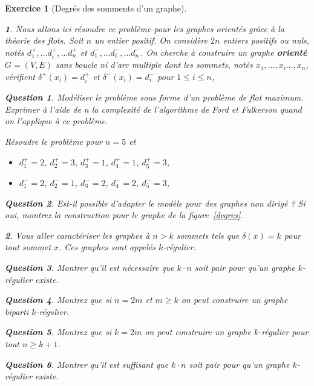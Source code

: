 \documentclass{article}
\theoremstyle{exostyle}
\newtheorem{exo}{Exercice}
\theoremstyle{partiestyle}
\newtheorem{partie}{}[exo]
\theoremstyle{questionstyle}
\newtheorem{questionpartie}{Question}[partie]
\begin{document}
\begin{exo}[Degrés des somments d'un graphe]
\begin{partie}
	Nous allons ici résoudre ce problème pour les graphes orientés grâce à la théorie des flots. Soit $n$ un entier positif. On considère $2n$ entiers positifs ou nuls, notés $d^+_1, \dots d^+_i, \dots d^+_n$ et $d^-_1, \dots d^-_i, \dots d^-_n$. On cherche à construire un graphe {\bf orienté} $G = (V, E)$ sans boucle ni d’arc multiple dont les sommets, notés $x_1, \dots, x_i\dots , x_n$, vérifient $\delta^+(x_i) = d^+_i$ et $\delta^-(x_i) = d^-_i$ pour $1\leq i \leq n$,
	\begin{questionpartie}
		Modéliser le problème sous forme d’un problème de flot maximum. Exprimer à l’aide de n la complexité de l’algorithme de Ford et Fulkerson quand on l’applique à ce problème.
	\end{questionpartie}
	Résoudre le problème pour $n=5$ et
		\begin{itemize}
			\item $d^+_1 = 2$, $d^+_2 = 3$, $d^+_3 = 1$, $d^+_4 = 1$, $d^+_5 = 3$,
			\item $d^-_1 = 2$, $d^-_2 = 1$, $d^-_3 = 2$, $d^-_4 = 2$, $d^-_5 = 3$,
		\end{itemize}	
	\begin{questionpartie}
		Est-il possible d'adapter le modèle pour des graphes non dirigé ? Si oui, montrez la construction pour le graphe de la figure~\ref{degres}. 
	\end{questionpartie}
\end{partie}
\begin{partie}	
	Vous aller caractériser les graphes à $n>k$ sommets tels que $\delta(x) = k$ pour tout sommet $x$. Ces graphes sont appelés $k$-régulier.
	\begin{questionpartie}
		Montrer qu'il est nécessaire que $k\cdot n$ soit pair pour qu'un graphe $k$-régulier existe.
	\end{questionpartie}
	\begin{questionpartie}
		Montrez que si $n=2m$ et $m\geq k$ on peut construire un graphe biparti $k$-régulier.
	\end{questionpartie}
	\begin{questionpartie}
		Montrez que si $k=2m$ on peut construire un graphe $k$-régulier pour tout $n\geq k+1$.
	\end{questionpartie}
	\begin{questionpartie}
		Montrer qu'il est suffisant que $k\cdot n$ soit pair pour qu'un graphe $k$-régulier existe.
	\end{questionpartie}
	
\end{partie}
\end{exo}
\end{document}
